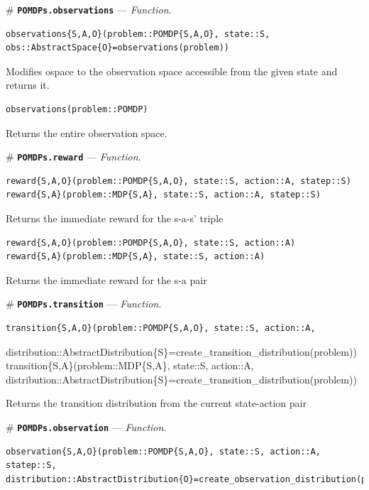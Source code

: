 \documentclass[12pt,]{article}
\begin{document}
\# \textbf{\texttt{POMDPs.observations}} --- \emph{Function}.

\begin{verbatim}
observations{S,A,O}(problem::POMDP{S,A,O}, state::S, obs::AbstractSpace{O}=observations(problem))
\end{verbatim}

Modifies ospace to the observation space accessible from the given state
and returns it.

\begin{verbatim}
observations(problem::POMDP)
\end{verbatim}

Returns the entire observation space.

\# \textbf{\texttt{POMDPs.reward}} --- \emph{Function}.

\begin{verbatim}
reward{S,A,O}(problem::POMDP{S,A,O}, state::S, action::A, statep::S)
reward{S,A}(problem::MDP{S,A}, state::S, action::A, statep::S)
\end{verbatim}

Returns the immediate reward for the s-a-s' triple

\begin{verbatim}
reward{S,A,O}(problem::POMDP{S,A,O}, state::S, action::A)
reward{S,A}(problem::MDP{S,A}, state::S, action::A)
\end{verbatim}

Returns the immediate reward for the s-a pair

\# \textbf{\texttt{POMDPs.transition}} --- \emph{Function}.

\begin{verbatim}
transition{S,A,O}(problem::POMDP{S,A,O}, state::S, action::A,
\end{verbatim}

distribution::AbstractDistribution\{S\}=create\_transition\_distribution(problem))
transition\{S,A\}(problem::MDP\{S,A\}, state::S, action::A,
distribution::AbstractDistribution\{S\}=create\_transition\_distribution(problem))

Returns the transition distribution from the current state-action pair

\# \textbf{\texttt{POMDPs.observation}} --- \emph{Function}.

\begin{verbatim}
observation{S,A,O}(problem::POMDP{S,A,O}, state::S, action::A, statep::S, distribution::AbstractDistribution{O}=create_observation_distribution(problem))
\end{verbatim}
\end{document}
